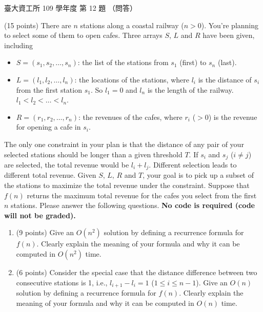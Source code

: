\begin{pastexam}[label={px:ntu-109-dsaa-12}]{臺大資工所 109 學年度 第 12 題}
（問答）

(15 points) There are $n$ stations along a coastal railway ($n>0$). You're planning to select some
of them to open cafes. Three arrays $S$, $L$ and $R$ have been given, including
\begin{itemize}
\item $S=(s_1,s_2,\ldots,s_n)$: the list of the stations from $s_1$ (first) to $s_n$ (last).
\item $L=(l_1,l_2,\ldots,l_n)$: the locations of the stations, where $l_i$ is the distance of
$s_i$ from the first station $s_1$. So $l_1=0$ and $l_n$ is the length of the railway.
$l_1<l_2<\ldots<l_n$.
\item $R=(r_1,r_2,\ldots,r_n)$: the revenues of the cafes, where $r_i$ ($>0$) is the revenue for
opening a cafe in $s_i$.
\end{itemize}
The only one constraint in your plan is that the distance of any pair of your selected stations
should be longer than a given threshold $T$. If $s_i$ and $s_j$ ($i\ne j$) are selected, the
total revenue would be $l_i+l_j$. Different selection leads to different total revenue. Given
$S$, $L$, $R$ and $T$, your goal is to pick up a subset of the stations to maximize the total
revenue under the constraint. Suppose that $f(n)$ returns the maximum total revenue for the
cafes you select from the first $n$ stations. Please answer the following questions.
\textbf{No code is required (code will not be graded).}
\begin{enumerate}[label=(\alph*)]
\item (9 points) Give an $O(n^2)$ solution by defining a recurrence formula for $f(n)$. Clearly
explain the meaning of your formula and why it can be computed in $O(n^2)$ time.
\item (6 points) Consider the special case that the distance difference between two consecutive
stations is 1, i.e., $l_{i+1}-l_i=1$ ($1\le i\le n-1$). Give an $O(n)$ solution by defining a
recurrence formula for $f(n)$. Clearly explain the meaning of your formula and why it can be
computed in $O(n)$ time.
\end{enumerate}
\end{pastexam}

